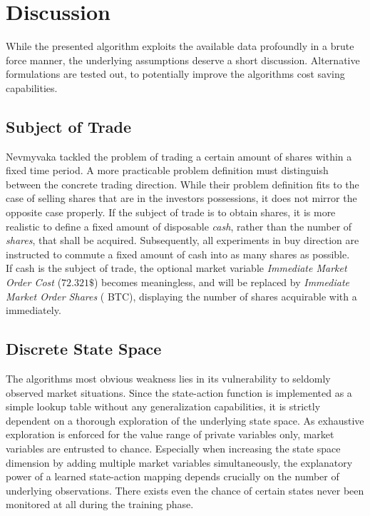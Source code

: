 \section{Discussion}
\label{chap:backwardalgorithm:discussion}
While the presented algorithm exploits the available data profoundly in a brute force manner, the underlying assumptions deserve a short discussion. Alternative formulations are tested out, to potentially improve the algorithms cost saving capabilities.

\subsection{Subject of Trade}
Nevmyvaka \etal \cite{Nevmyvaka:2006} tackled the problem of trading a certain amount of shares within a fixed time period. A more practicable problem definition must distinguish between the concrete trading direction. While their problem definition fits to the case of selling shares that are in the investors possessions, it does not mirror the opposite case properly. If the subject of trade is to obtain shares, it is more realistic to define a fixed amount of disposable \emph{cash}, rather than the number of \emph{shares}, that shall be acquired. Subsequently, all experiments in buy direction are instructed to commute a fixed amount of cash into as many shares as possible.\\
 
If cash is the subject of trade, the optional market variable \emph{Immediate Market Order Cost}  (\eg $72.321\$$) becomes meaningless, and will be replaced by \emph{Immediate Market Order Shares} ( BTC), displaying the number of shares acquirable with a immediately.

\subsection{Discrete State Space}
The algorithms most obvious weakness lies in its vulnerability to seldomly observed market situations. Since the state-action function is implemented as a simple lookup table without any generalization capabilities, it is strictly dependent on a thorough exploration of the underlying state space. As exhaustive exploration is enforced for the value range of private variables only, market variables are entrusted to chance. Especially when increasing the state space dimension by adding multiple market variables simultaneously, the explanatory power of a learned state-action mapping depends crucially on the number of underlying observations. There exists even the chance of certain states never been monitored at all during the training phase.\\

